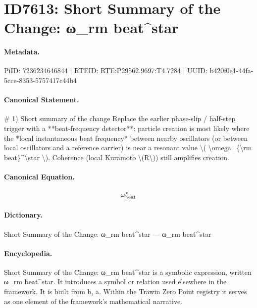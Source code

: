 \section*{ID7613: Short Summary of the Change: ω\_rm beat\textasciicircum{}star}
\paragraph{Metadata.}
PiID: 7236234646844 | RTEID: RTE:P29562.9697:T4.7284 | UUID: b420f0e1-44fa-5cce-8353-5757417c44b4

\paragraph{Canonical Statement.}
\# 1) Short summary of the change Replace the earlier phase-slip / half-step trigger with a **beat-frequency detector**: particle creation is most likely where the *local instantaneous beat frequency* between nearby oscillators (or between local oscillators and a reference carrier) is near a resonant value \textbackslash{}( \textbackslash{}omega\_\{\textbackslash{}rm beat\}\textasciicircum{}\textbackslash{}star \textbackslash{}). Coherence (local Kuramoto \textbackslash{}(R\textbackslash{})) still amplifies creation.

\paragraph{Canonical Equation.}
\[
\omega_{\rm beat}^\star
\]

\paragraph{Dictionary.}
Short Summary of the Change: ω\_rm beat\textasciicircum{}star — ω\_rm beat\textasciicircum{}star

\paragraph{Encyclopedia.}
Short Summary of the Change: ω\_rm beat\textasciicircum{}star is a symbolic expression, written ω\_rm beat\textasciicircum{}star. It introduces a symbol or relation used elsewhere in the framework. It is built from b, a. Within the Trawin Zero Point registry it serves as one element of the framework's mathematical narrative.
